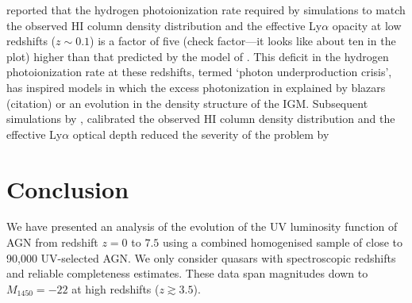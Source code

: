 \documentclass[a4paper,fleqn,usenatbib]{mnras}
\begin{document}
\citet{2014ApJ...789L..32K} reported that the hydrogen photoionization
rate required by simulations to match the observed HI column density
distribution and the effective Ly$\alpha$ opacity at low redshifts
($z\sim 0.1$) is a factor of five (check factor---it looks like about
ten in the plot) higher than that predicted by the model of
\citep{2012ApJ...746..125H}.  This deficit in the hydrogen
photoionization rate at these redshifts, termed `photon
underproduction crisis', has inspired models in which the excess
photonization in explained by blazars (citation) or an evolution in
the density structure of the IGM.  Subsequent simulations by
\citet{2015ApJ...811....3S}, calibrated the observed HI column density
distribution and the effective Ly$\alpha$ optical depth reduced the
severity of the problem by 

\section{Conclusion}

We have presented an analysis of the evolution of the UV luminosity
function of AGN from redshift $z=0$ to $7.5$ using a combined
homogenised sample of close to 90,000 UV-selected AGN.  We only
consider quasars with spectroscopic redshifts and reliable
completeness estimates.  These data span magnitudes down to
$M_{1450}=-22$ at high redshifts ($z\gtrsim 3.5$).
\end{document}
